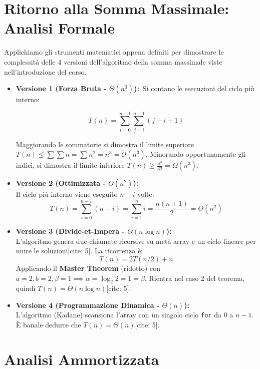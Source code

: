 \documentclass[12pt, a4paper]{article}
\begin{document}
\newpage

\section{Ritorno alla Somma Massimale: Analisi Formale}
Applichiamo gli strumenti matematici appena definiti per dimostrare le complessità delle 4 versioni dell'algoritmo della somma massimale viste nell'introduzione del corso.

\begin{itemize}
\item \textbf{Versione 1 (Forza Bruta - $\Theta(n^3)$):}\
Si contano le esecuzioni del ciclo più interno:


$$T(n) = \sum_{i=0}^{n-1} \sum_{j=i}^{n-1} (j - i + 1)$$


Maggiorando le sommatorie si dimostra il limite superiore $T(n) \le \sum \sum n = \sum n^2 = n^3 = \mathcal{O}(n^3)$.
Minorando opportunamente gli indici, si dimostra il limite inferiore $T(n) \ge \frac{n^3}{32} = \Omega(n^3)$.

\item \textbf{Versione 2 (Ottimizzata - $\Theta(n^2)$):}\\
Il ciclo più interno viene eseguito $n-i$ volte:
$$T(n) = \sum_{i=0}^{n-1} (n - i) = \sum_{i=1}^{n} i = \frac{n(n+1)}{2} = \Theta(n^2)$$

\item \textbf{Versione 3 (Divide-et-Impera - $\Theta(n \log n)$):}\\
L'algoritmo genera due chiamate ricorsive su metà array e un ciclo lineare per unire le soluzioni[cite: 5].
La ricorrenza è:
$$T(n) = 2T(n/2) + n$$
Applicando il \textbf{Master Theorem} (ridotto) con $a=2, b=2, \beta=1 \implies \alpha = \log_2 2 = 1 = \beta$.
Rientra nel caso 2 del teorema, quindi $T(n) = \Theta(n \log n)$[cite: 5].

\item \textbf{Versione 4 (Programmazione Dinamica - $\Theta(n)$):}\\
L'algoritmo (Kadane) scansiona l'array con un singolo ciclo \texttt{for} da $0$ a $n-1$. È banale dedurre che $T(n) = \Theta(n)$[cite: 5].

\end{itemize}



\section{Analisi Ammortizzata}
\end{document}

